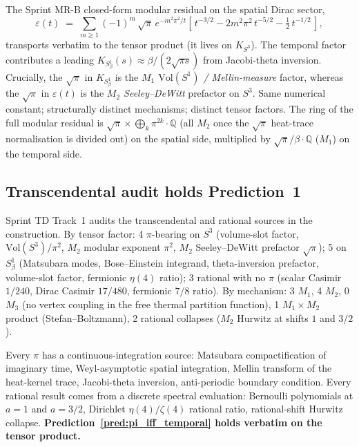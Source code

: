 \documentclass[11pt]{article}
\begin{document}
The Sprint MR-B closed-form modular residual on the spatial Dirac
sector,
\begin{equation}
\label{eq:dirac_modular_residual_tensor}
\varepsilon(t) \;=\; \sum_{m\geq 1} (-1)^m\,\sqrt{\pi}\,e^{-m^2\pi^2/t}
                    \left[\,t^{-3/2} - 2m^2\pi^2\,t^{-5/2}
                          - \tfrac{1}{2}\,t^{-1/2}\,\right],
\end{equation}
transports verbatim to the tensor product (it lives on $K_{S^3}$).
The temporal factor contributes a leading
$K_{S^1_\beta}(s) \approx \beta/(2\sqrt{\pi s})$ from Jacobi-theta
inversion.  Crucially, the $\sqrt{\pi}$ in $K_{S^1_\beta}$ is the
\emph{$M_1$ $\mathrm{Vol}(S^1)$ / Mellin-measure} factor, whereas the
$\sqrt{\pi}$ in $\varepsilon(t)$ is the \emph{$M_2$ Seeley--DeWitt}
prefactor on $S^3$.  Same numerical constant; structurally distinct
mechanisms; distinct tensor factors.  The ring of the full modular
residual is $\sqrt{\pi}\times\bigoplus_k\pi^{2k}\cdot\mathbb{Q}$
(all $M_2$ once the $\sqrt{\pi}$ heat-trace normalisation is divided
out) on the spatial side, multiplied by
$\sqrt{\pi}/\beta\cdot\mathbb{Q}$ ($M_1$) on the temporal side.

\subsection{Transcendental audit holds Prediction~1}
\label{subsec:tensor_audit}

Sprint TD Track~1 audits the transcendental and rational sources in
the construction.  By tensor factor: 4 $\pi$-bearing on $S^3$ (volume-slot
factor, $\mathrm{Vol}(S^3)/\pi^2$, $M_2$ modular exponent $\pi^2$,
$M_2$ Seeley--DeWitt prefactor $\sqrt{\pi}$); 5 on $S^1_\beta$
(Matsubara modes, Bose--Einstein integrand, theta-inversion prefactor,
volume-slot factor, fermionic $\eta(4)$ ratio); 3 rational with no
$\pi$ (scalar Casimir $1/240$, Dirac Casimir $17/480$, fermionic
$7/8$ ratio).  By mechanism: 3 $M_1$, 4 $M_2$, 0 $M_3$ (no vertex
coupling in the free thermal partition function), 1 $M_1\times M_2$
product (Stefan--Boltzmann), 2 rational collapses ($M_2$ Hurwitz at
shifts $1$ and $3/2$).

Every $\pi$ has a continuous-integration source: Matsubara
compactification of imaginary time, Weyl-asymptotic spatial
integration, Mellin transform of the heat-kernel trace, Jacobi-theta
inversion, anti-periodic boundary condition.  Every rational result
comes from a discrete spectral evaluation: Bernoulli polynomials at
$a=1$ and $a=3/2$, Dirichlet $\eta(4)/\zeta(4)$ rational ratio,
rational-shift Hurwitz collapse.  \textbf{Prediction~\ref{pred:pi_iff_temporal} holds
verbatim on the tensor product.}
\end{document}
